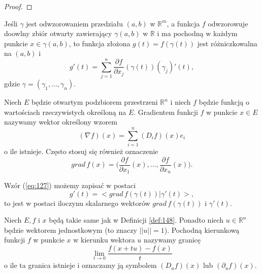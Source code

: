 \documentclass[leqno]{article}
\begin{document}
\begin{justify}
\begin{proof}
\end{proof}

\begin{wniosek}
{
    Jeśli $\gamma$ jest odwzorowaniem przedziału $(a,b)$ w $\mathbb{R}^m$, a funkcja $f$ odwzorowuje doowlny zbiór otwarty zawierający $\gamma(a,b)$ w $\mathbb{R}$ i ma
    pochodną w każdym punkcie $x \in \gamma(a,b)$, to funkcja złożona $g(t) = f(\gamma(t))$ jest różniczkowalna na $(a,b)$ i 
    \begin{equation}\label{eq:127}
        g'(t) = \sum_{j=1}^{n}\frac{\partial f}{\partial x_j}(\gamma(t))(\gamma_j)'(t),
    \end{equation}
    gdzie $\gamma = (\gamma_1, \ldots, \gamma_n)$.
}
\end{wniosek}

\begin{defn}
    Niech $E$ będzie otwartym podzbiorem przestrzeni $\mathbb{R}^n$ i niech $f$ będzie funkcją o wartościach rzeczywistych określoną na $E$. Gradientem funkcji $f$
    w punkcie $x \in E$ nazywamy wektor określony wzorem 
    \[
        (\nabla f)(x) = \sum_{i=1}^{n}(D_i f)(x)e_i
    \]
    o ile istnieje. Często stosuj się również oznaczenie 
    \[
        grad \, f(x) = \Big(\frac{\partial f}{\partial x_1}(x), \ldots, \frac{\partial f}{\partial x_n}(x)\Big).
    \]
\end{defn}

\begin{uwaga}
    Wzór (\ref{eq:127}) możemy zapisać w postaci 
    \[
        g'(t) = < grad \, f(\gamma(t)) | \gamma'(t)>,
    \]
    to jest w postaci iloczynu skalarnego wektorów $grad \, f(\gamma(t))$ i $\gamma'(t)$.
\end{uwaga}

\begin{defn}
    Niech $E, f$ i $x$ będą takie same jak w Definicji \ref{def:148}. Ponadto niech $u \in \mathbb{R}^n$ będzie wektorem jednostkowym (to znaczy $||u||=1$).
    Pochodną kierunkową funkcji $f$ w punkcie $x$ w kierunku wektora $u$ nazywamy granicę 
    \[
        \lim_{t \to 0}\frac{f(x + tu) - f(x)}{t}
    \]
    o ile ta granica istnieje i oznaczamy ją symbolem $(D_u f)(x)$ lub $(\partial_u f)(x)$.
\end{defn}


\end{justify}
\end{document}
